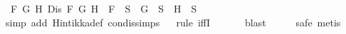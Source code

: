 \begin{isabellebody}
{\isasymand}\ {\isacharparenleft}{\isasymforall}F\ G\ H{\isachardot}\ Dis\ F\ G\ H\ {\isasymlongrightarrow}\ F\ {\isasymin}\ S\ {\isasymlongrightarrow}\ G\ {\isasymin}\ S\ {\isasymor}\ H\ {\isasymin}\ S{\isacharparenright}{\isacharparenright}{\isachardoublequoteclose}\ \ \isanewline
%
\isadelimproof
\ \ %
\endisadelimproof
%
\isatagproof
{}\isamarkupfalse%
{\isacharparenleft}simp\ add{\isacharcolon}\ Hintikka{\isacharunderscore}def\ con{\isacharunderscore}dis{\isacharunderscore}simps{\isacharparenright}\isanewline
\ \ \isamarkupfalse%
{\isacharparenleft}rule\ iffI{\isacharparenright}\isanewline
\ \ \ \isamarkupfalse%
\ \isamarkupfalse%
\ blast\isanewline
\ \ \isamarkupfalse%
\ \isamarkupfalse%
\ safe\ metis{\isacharplus}\isanewline
\ \ \isamarkupfalse%
\isanewline
%
\endisatagproof
{\isafoldproof}%
%
\isadelimproof
%
\endisadelimproof
%
\isadelimtheory
%
\endisadelimtheory
%
\isatagtheory
%
\endisatagtheory
{\isafoldtheory}%
%
\isadelimtheory
%
\endisadelimtheory
%
\end{isabellebody}%
\endinput
